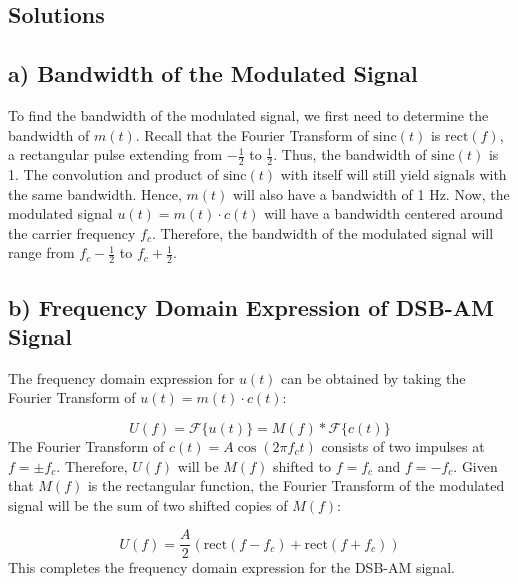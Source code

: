 \documentclass{article}
\begin{document}
\subsection*{Solutions}

\subsection*{a) Bandwidth of the Modulated Signal}
To find the bandwidth of the modulated signal, we first need to determine the bandwidth of \( m(t) \). Recall that the Fourier Transform of \( \text{sinc}(t) \) is \( \text{rect}(f) \), a rectangular pulse extending from \( -\frac{1}{2} \) to \( \frac{1}{2} \). Thus, the bandwidth of \( \text{sinc}(t) \) is 1. The convolution and product of \( \text{sinc}(t) \) with itself will still yield signals with the same bandwidth. Hence, \( m(t) \) will also have a bandwidth of 1 Hz.
\newline \newline
Now, the modulated signal \( u(t) = m(t) \cdot c(t) \) will have a bandwidth centered around the carrier frequency \( f_c \). Therefore, the bandwidth of the modulated signal will range from \( f_c - \frac{1}{2} \) to \( f_c + \frac{1}{2} \).

\subsection*{b) Frequency Domain Expression of DSB-AM Signal}
The frequency domain expression for \( u(t) \) can be obtained by taking the Fourier Transform of \( u(t) = m(t) \cdot c(t) \):

\[
U(f) = \mathcal{F}\{u(t)\} = M(f) \ast \mathcal{F}\{c(t)\}
\]
\newline \newline
The Fourier Transform of \( c(t) = A \cos(2\pi f_c t) \) consists of two impulses at \( f = \pm f_c \). Therefore, \( U(f) \) will be \( M(f) \) shifted to \( f = f_c \) and \( f = -f_c \).
\newline \newline
Given that \( M(f) \) is the rectangular function, the Fourier Transform of the modulated signal will be the sum of two shifted copies of \( M(f) \):

\[
U(f) = \frac{A}{2} \left( \text{rect}\left(f - f_c\right) + \text{rect}\left(f + f_c\right) \right)
\]
\newline \newline
This completes the frequency domain expression for the DSB-AM signal.
\end{document}
